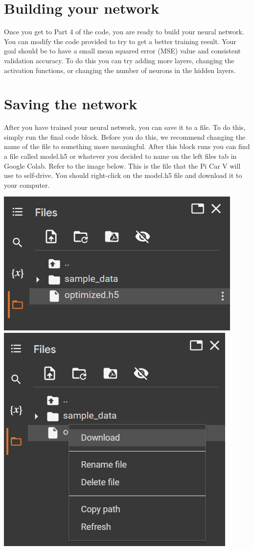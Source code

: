 \documentclass[11pt]{report}
\begin{document}
\section{Building your network}
Once you get to Part 4 of the code, you are ready to build your neural network. You can modify the code provided to try to get a better training result. Your goal should be to have a small mean squared error (MSE) value and consistent validation accuracy. To do this you can try adding more layers, changing the activation functions, or changing the number of neurons in the hidden layers.

\section{Saving the network}
After you have trained your neural network, you can save it to a file. To do this, simply run the final code block. Before you do this, we recommend changing the name of the file to something more meaningful. After this block runs you can find a file called model.h5 or whatever you decided to name on the left files tab in Google Colab. Refer to the image below. This is the file that the Pi Car V will use to self-drive. You should right-click on the model.h5 file and download it to your computer. 

\begin{center}
    \includegraphics[scale=0.6]{savved.png}
    \includegraphics[scale=0.6]{downloadh5.png}
\end{center}
\end{document}
